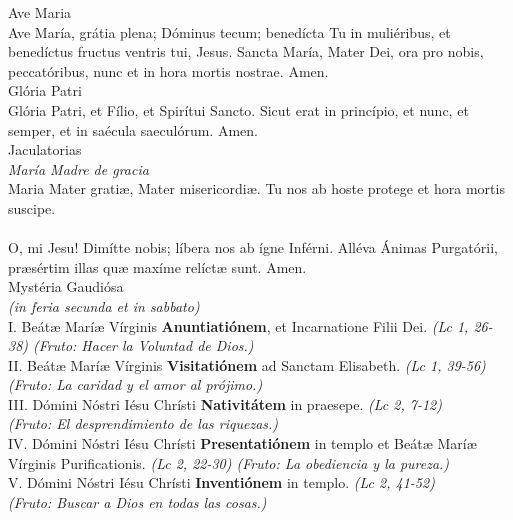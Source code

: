 \documentclass[letterpaper, landscape, 10pt, twocolumn]{article}
\begin{document}
  \Large {\color{red} Ave Maria}\\
  \normalsize {\color{red} A}ve María, grátia plena; Dóminus tecum; benedícta Tu in muliéribus, et benedíctus fructus ventris tui, Jesus. {\color{red} S}ancta María, Mater Dei, ora pro nobis, peccatóribus, nunc et in hora mortis nostrae. {\color{red} A}men.\\

  \Large {\color{red} Glória Patri}\\
  \normalsize {\color{red} G}lória Patri, et Fílio, et Spirítui Sancto. {\color{red} S}icut erat in princípio, et nunc, et semper, et in saécula saeculórum. {\color{red} A}men.\\

  \Large {\color{red}Jaculatorias}\\
  \normalsize {\color{red} \textit{María Madre de gracia}}\\
  {\color{red} M}aria Mater gratiæ, Mater misericordiæ. {\color{red} T}u nos ab hoste protege et hora mortis suscipe.\\

  \\
  {\color{red} O}, mi Jesu! Dimítte nobis; líbera nos ab ígne Inférni. Alléva Ánimas Purgatórii, præsértim illas quæ maxíme relíctæ sunt. {\color{red}A}men.\\

  \Large {\color{red} Mystéria Gaudiósa}\\
  \normalsize {\color{red} \textit{(in feria secunda et in sabbato)}}\\
  {\color{red} I.} Beátæ Maríæ Vírginis \textbf{Anuntiatiónem}, et Incarnatione Filii Dei. {\color{red} \textit{(Lc 1, 26-38) (Fruto: Hacer la Voluntad de Dios.)}}\\
  {\color{red} II.} Beátæ Maríæ Vírginis \textbf{Visitatiónem} ad Sanctam Elisabeth. {\color{red} \textit{(Lc 1, 39-56)\\
  (Fruto: La caridad y el amor al prójimo.)}}\\
  {\color{red} III.} Dómini Nóstri Iésu Chrísti \textbf{Nativitátem} in praesepe. {\color{red} \textit{(Lc 2, 7-12)\\
  (Fruto: El desprendimiento de las riquezas.)}}\\
  {\color{red} IV.} Dómini Nóstri Iésu Chrísti \textbf{Presentatiónem} in templo et Beátæ Maríæ Vírginis Purificationis. {\color{red} \textit{(Lc 2, 22-30) (Fruto: La obediencia y la pureza.)}}\\
  {\color{red} V.} Dómini Nóstri Iésu Chrísti \textbf{Inventiónem} in templo. {\color{red} \textit{(Lc 2, 41-52)\\
  (Fruto: Buscar a Dios en todas las cosas.)}}\\
\end{document}
